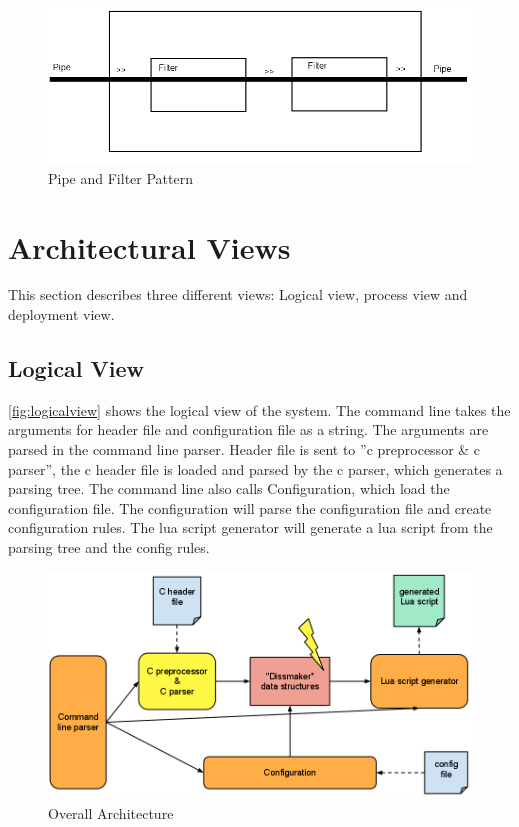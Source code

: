 \begin{figure}[htb]
	\includegraphics[width=\textwidth]{./planning/img/PipeAndFilter}
	\caption{Pipe and Filter Pattern\label{fig:pipefilter}}
\end{figure}


\section{Architectural Views}
This section describes three different views: Logical view, process view and deployment view.

\subsection{Logical View}
\autoref{fig:logicalview} shows the logical view of the system. The command line takes the arguments for \gls{header} file and configuration file as a string. The arguments are parsed in the command line \gls{parser}. Header file is sent to ''\Gls{c} \gls{preprocessor} \& \Gls{c} \gls{parser}'', the \Gls{c} \gls{header} file is loaded and parsed by the \Gls{c} \gls{parser}, which generates a parsing tree. The command line also calls Configuration, which load the configuration file. The configuration will parse the configuration file and create configuration rules. The \Gls{lua} \gls{script} generator will generate a \Gls{lua} \gls{script} from the parsing tree and the config rules.

\begin{figure}[htb]
	\includegraphics[width=\textwidth]{./planning/img/overall_design}
	\caption{Overall Architecture\label{fig:logicalview}}
\end{figure}


